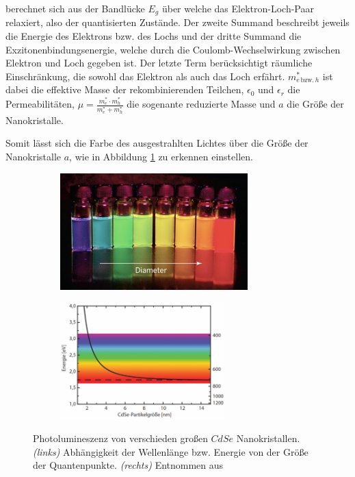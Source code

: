       berechnet sich aus der Bandlücke $E_g$ über welche das Elektron-Loch-Paar relaxiert, also der quantisierten Zustände. Der zweite Summand beschreibt jeweils die Energie des Elektrons bzw. des Lochs und der dritte Summand die Exzitonenbindungsenergie, welche durch die Coulomb-Wechselwirkung zwischen Elektron und Loch gegeben ist. Der letzte Term berücksichtigt räumliche Einschränkung, die sowohl das Elektron als auch das Loch erfährt.
      $m_{e\,\text{bzw.}\,h}^*$ ist dabei die effektive Masse der rekombinierenden Teilchen, $\epsilon_0$ und $\epsilon_r$ die Permeabilitäten, $\mu=\frac{m_e^*\cdot m_h^*}{m_e^* + m_h^*}$ die sogenante reduzierte Masse und $a$ die Größe der Nanokristalle.

      Somit lässt sich die Farbe des ausgestrahlten Lichtes über die Größe der Nanokristalle $a$, wie in Abbildung \ref{fig:Farbe} zu erkennen einstellen.
      \begin{figure}[h]
        \begin{subfigure}{0.48\textwidth}
          \centering
          \includegraphics[height=4.5cm]{pictures/Farbe.png}
        \end{subfigure}
        \hfill
        \begin{subfigure}{0.48\textwidth}
          \centering
          \includegraphics[height=4.5cm]{pictures/Farbe2.png}
        \end{subfigure}
        \caption{Photolumineszenz von verschieden großen $CdSe$ Nanokristallen. \textit{(links)} Abhängigkeit der Wellenlänge bzw. Energie von der Größe der Quantenpunkte. \textit{(rechts)} Entnommen aus \cite{tu_dortmund_versuchsanleitung_2021-6}}
        \label{fig:Farbe}
      \end{figure}
